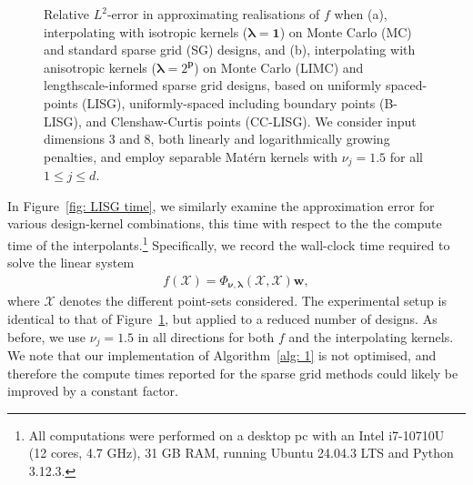 \documentclass[pdflatex,sn-mathphys-num]{sn-jnl}%
\theoremstyle{thmstyleone}%
\theoremstyle{thmstyletwo}%
\theoremstyle{thmstylethree}%
\begin{document}
\begin{figure}[h]
\begin{subfigure}{.45\textwidth}
    \end{subfigure}
    \caption{Relative \(L^2\)-error in approximating realisations of \(f\) when (a), interpolating with isotropic kernels (\(\boldsymbol{\lambda}=\mathbf{1}\)) on Monte Carlo (MC) and standard sparse grid (SG) designs, and (b), interpolating with anisotropic kernels (\(\boldsymbol{\lambda}=2^\mathbf{p}\)) on Monte Carlo (LIMC) and lengthscale-informed sparse grid designs, based on uniformly spaced-points (LISG), uniformly-spaced including boundary points (B-LISG), and Clenshaw-Curtis points (CC-LISG). We consider input dimensions 3 and 8, both linearly and logarithmically growing penalties, and employ separable Mat\'ern kernels with \(\nu_j=1.5\) for all \(1\leq j \leq d\).}
    \label{fig: iso vs LISG}
\end{figure}

In Figure~\ref{fig: LISG time}, we similarly examine the approximation error for various design-kernel combinations, this time with respect to the the compute time of the interpolants.\footnote{All computations were performed on a desktop pc with an Intel i7-10710U (12 cores, 4.7 GHz), 31 GB RAM, running Ubuntu 24.04.3 LTS and Python 3.12.3.} Specifically, we record the wall-clock time required to solve the linear system
\begin{align}
f(\mathcal{X})=\Phi_{\boldsymbol{\nu},\boldsymbol{\lambda}}(\mathcal{X},\mathcal{X})\mathbf{w},\nonumber
\end{align}
where \(\mathcal{X}\) denotes the different point-sets considered. The experimental setup is identical to that of Figure~\ref{fig: iso vs LISG}, but applied to a reduced number of designs. As before, we use \(\nu_j=1.5\) in all directions for both \(f\) and the interpolating kernels. We note that our implementation of Algorithm~\ref{alg: 1} is not optimised, and therefore the compute times reported for the sparse grid methods could likely be improved by a constant factor.
\end{document}
